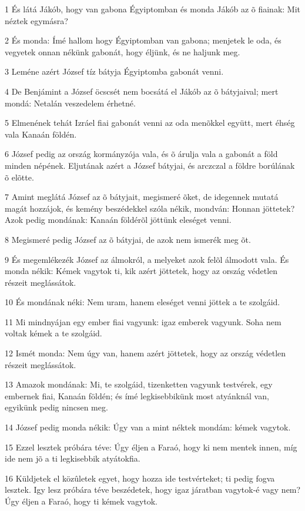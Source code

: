 \par 1 És látá Jákób, hogy van gabona Égyiptomban és monda Jákób az õ fiainak: Mit néztek egymásra?
\par 2 És monda: Ímé hallom hogy Égyiptomban van gabona; menjetek le oda, és vegyetek onnan nékünk gabonát, hogy éljünk, és ne haljunk meg.
\par 3 Leméne azért József tíz bátyja Égyiptomba gabonát venni.
\par 4 De Benjámint a József öcscsét nem bocsátá el Jákób az õ bátyjaival; mert mondá: Netalán veszedelem érhetné.
\par 5 Elmenének tehát Izráel fiai gabonát venni az oda menõkkel együtt, mert éhség vala Kanaán földén.
\par 6 József pedig az ország kormányzója vala, és õ árulja vala a gabonát a föld minden népének. Eljutának azért a József bátyjai, és arczczal a földre borúlának õ elõtte.
\par 7 Amint meglátá József az õ bátyjait, megismeré õket, de idegennek mutatá magát hozzájok, és kemény beszédekkel szóla nékik, mondván: Honnan jöttetek? Azok pedig mondának: Kanaán földérõl jöttünk eleséget venni.
\par 8 Megismeré pedig József az õ bátyjai, de azok nem ismerék meg õt.
\par 9 És megemlékezék József az álmokról, a melyeket azok felõl álmodott vala. És monda nékik: Kémek vagytok ti, kik azért jöttetek, hogy az ország védetlen részeit meglássátok.
\par 10 És mondának néki: Nem uram, hanem eleséget venni jöttek a te szolgáid.
\par 11 Mi mindnyájan egy ember fiai vagyunk: igaz emberek vagyunk. Soha nem voltak kémek a te szolgáid.
\par 12 Ismét monda: Nem úgy van, hanem azért jöttetek, hogy az ország védetlen részeit meglássátok.
\par 13 Amazok mondának: Mi, te szolgáid, tizenketten vagyunk testvérek, egy embernek fiai, Kanaán földén; és ímé legkisebbikünk most atyánknál van, egyikünk pedig nincsen meg.
\par 14 József pedig monda nékik: Úgy van a mint néktek mondám: kémek vagytok.
\par 15 Ezzel lesztek próbára téve: Úgy éljen a Faraó, hogy ki nem mentek innen, míg ide nem jõ a ti legkisebbik atyátokfia.
\par 16 Küldjetek el közûletek egyet, hogy hozza ide testvérteket; ti pedig fogva lesztek. Igy lesz próbára téve beszédetek, hogy igaz járatban vagytok-é vagy nem? Úgy éljen a Faraó, hogy ti kémek vagytok.
